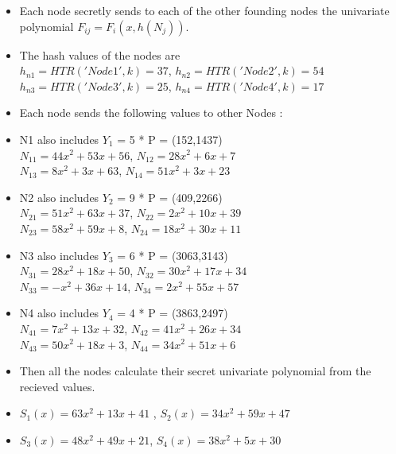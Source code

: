 \documentclass[11pt,a4paper]{llncs}
\begin{document}
\begin{itemize}
   \item Each node secretly sends to each of the other founding nodes the univariate polynomial 
   $F_{ij} = F_i(x,h(N_j)) $.
   \item The hash values of the nodes are \\
        $ h_{n1} = HTR('Node1',k) = 37 $, $ h_{n2} = HTR('Node2',k) = 54 $ \\
        $ h_{n3} = HTR('Node3',k) = 25 $, $ h_{n4} = HTR('Node4',k) = 17 $ 
     \end{itemize}
        
        \begin{itemize}
        \item Each node sends the following values to other Nodes :
        \item  N1 also includes $Y_1$ = 5 * P = (152,1437) \\
        $N_{11} = 44 x^{2} + 53 x + 56 $,
        $N_{12} = 28 x^{2} + 6 x + 7 $\\
        $N_{13} = 8 x^{2} + 3 x + 63 $,
        $N_{14} = 51 x^{2} + 3 x + 23 $
        \item N2 also includes $Y_2$ = 9 * P = (409,2266) \\
        $N_{21} = 51 x^{2} + 63 x + 37 $,
        $N_{22} = 2 x^{2} + 10 x + 39 $\\
        $N_{23} = 58 x^{2} + 59 x + 8 $,
        $N_{24} = 18 x^{2} + 30 x + 11 $    
        \item N3 also includes $Y_3$ = 6 * P = (3063,3143) \\
        $N_{31} = 28 x^{2} + 18 x + 50 $,
        $N_{32} = 30 x^{2} + 17 x + 34 $\\
        $N_{33} = - x^{2} + 36 x + 14 $,
        $N_{34} =  2 x^{2} + 55 x + 57 $
        \item N4 also includes $Y_4$ = 4 * P = (3863,2497) \\
        $N_{41} = 7 x^{2} + 13 x + 32 $,
        $N_{42} = 41 x^{2} + 26 x + 34 $\\
        $N_{43} = 50 x^{2} + 18 x + 3 $,
        $N_{44} = 34 x^{2} + 51 x + 6$            
        \item Then all the nodes calculate their secret univariate polynomial from the recieved values.
        \item $S_1(x) =63 x^{2} + 13 x + 41 $ ,
         $S_2(x) = 34 x^{2} + 59 x + 47 $
        \item $S_3(x) = 48 x^{2} + 49 x + 21 $,
         $S_4(x) = 38 x^{2} + 5 x + 30 $ 
        
        \end {itemize}
        
\end{document}
